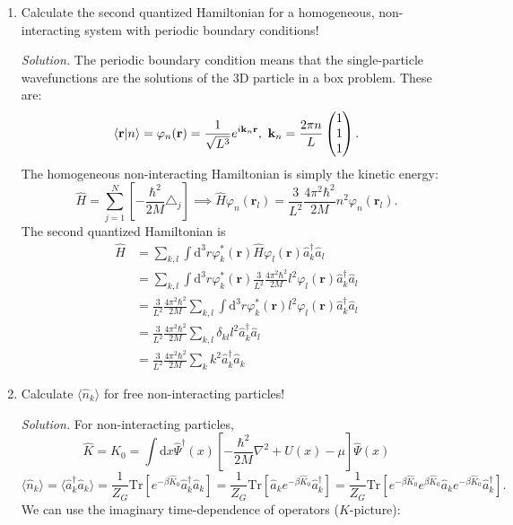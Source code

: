 \documentclass[11pt, a4paper]{article}
\newcommand{\dd}{\mathrm{d}}
\newcommand{\Tr}[1]{\mathrm{Tr}\left[#1\right]}
\begin{document}
\begin{enumerate}
    \item Calculate the second quantized Hamiltonian for a homogeneous, non-interacting system with periodic boundary conditions!
    \par \textit{Solution.}
    The periodic boundary condition means that the single-particle wavefunctions are the solutions of the 3D particle in a box problem.
    These are:
    \begin{equation*}
        \braket{\mathbf r | n} = \varphi_n(\mathbf r) = \frac{1}{\sqrt{L^3}}e^{i\mathbf k_n \mathbf r},
        ~\mathbf k_n = \frac{2\pi n}{L} \begin{pmatrix}
            1 \\ 1 \\ 1
        \end{pmatrix}.
    \end{equation*}
    The homogeneous non-interacting Hamiltonian is simply the kinetic energy:
    \begin{equation*}
        \hat H = \sum_{j=1}^N\left[-\frac{\hbar^2}{2M}\triangle_j\right]
        \implies \hat H \varphi_n(\mathbf r_l) = \frac{3}{L^2}\frac{4\pi^2\hbar^2}{2M}n^2\varphi_n(\mathbf r_l).
    \end{equation*}
    The second quantized Hamiltonian is
    \begin{align*}
        \hat H &= \sum\limits_{k,l}\int \dd^3 r \varphi^*_k(\mathbf r)\hat H\varphi_l(\mathbf r)\hat a_k^{\dagger}\hat a_l\\
        & = \sum\limits_{k,l}\int \dd^3 r \varphi^*_k(\mathbf r) \frac{3}{L^2}\frac{4\pi^2\hbar^2}{2M}l^2\varphi_l(\mathbf r)\hat a_k^{\dagger}\hat a_l\\
        & = \frac{3}{L^2}\frac{4\pi^2\hbar^2}{2M} \sum\limits_{k,l}\int \dd^3 r \varphi^*_k(\mathbf r)l^2\varphi_l(\mathbf r)\hat a_k^{\dagger}\hat a_l\\
        & = \frac{3}{L^2}\frac{4\pi^2\hbar^2}{2M} \sum\limits_{k,l} \delta_{kl}l^2 \hat a_k^{\dagger}\hat a_l\\
        & = \frac{3}{L^2}\frac{4\pi^2\hbar^2}{2M} \sum\limits_{k} k^2 \hat a_k^{\dagger}\hat a_k
    \end{align*}
    \item Calculate $\langle \hat n_k \rangle$ for free non-interacting particles!
    \par \textit{Solution.}
    For non-interacting particles,
    \begin{equation*}
        \hat K = \hat K_0 = \int\dd x \hat\Psi^{\dagger}(x)\left[ -\frac{\hbar^2}{2M}\nabla^2 + U(x) - \mu \right]\hat\Psi(x)
    \end{equation*}
    \begin{equation*}
        \langle \hat n_k \rangle = \langle \hat a_k^{\dagger}\hat a_k \rangle
        = \frac{1}{Z_G}\Tr{e^{-\beta \hat K_0}\hat a_k^{\dagger}\hat a_k} 
        = \frac{1}{Z_G}\Tr{\hat a_ke^{-\beta \hat K_0}\hat a_k^{\dagger}}
        = \frac{1}{Z_G}\Tr{e^{-\beta \hat K_0}e^{\beta \hat K_0}\hat a_ke^{-\beta \hat K_0}\hat a_k^{\dagger}}.
    \end{equation*}
    We can use the imaginary time-dependence of operators ($K$-picture):
    


\end{enumerate}
\end{document}

